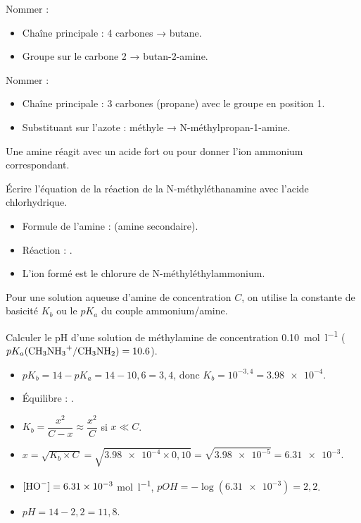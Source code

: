 \begin{exemple}
Nommer  :
\begin{itemize}
    \item Chaîne principale : 4 carbones → butane.
    \item Groupe  sur le carbone 2 → butan-2-amine.
\end{itemize}
Nommer  :
\begin{itemize}
    \item Chaîne principale : 3 carbones (propane) avec le groupe  en position 1.
    \item Substituant sur l'azote : méthyle → N-méthylpropan-1-amine.
\end{itemize}
\end{exemple}

Une amine  réagit avec un acide fort  ou  pour donner l'ion ammonium correspondant.

\begin{exemple}
Écrire l'équation de la réaction de la N-méthyléthanamine avec l'acide chlorhydrique.
\begin{itemize}
    \item Formule de l'amine :  (amine secondaire).
    \item Réaction : .
    \item L'ion formé est le chlorure de N-méthyléthylammonium.
\end{itemize}
\end{exemple}

Pour une solution aqueuse d'amine de concentration $C$, on utilise la constante de basicité $K_b$ ou le $pK_a$ du couple ammonium/amine.

\begin{exemple}
Calculer le pH d'une solution de méthylamine  de concentration \SI{0.10}{\mol\per\litre} ($pK_a(\ce{CH3NH3+/CH3NH2}) = \num{10.6}$).
\begin{itemize}
    \item $pK_b = 14 - pK_a = 14 - 10,6 = 3,4$, donc $K_b = 10^{-3,4} = \num{3,98e-4}$.
    \item Équilibre : .
    \item $K_b = \dfrac{x^2}{C - x} \approx \dfrac{x^2}{C}$ si $x \ll C$.
    \item $x = \sqrt{K_b \times C} = \sqrt{\num{3,98e-4} \times 0,10} = \sqrt{\num{3,98e-5}} = \num{6,31e-3}$.
    \item $[\ce{HO-}] = \num{6,31e-3}$ \si{\mol\per\litre}, $pOH = -\log(\num{6,31e-3}) = 2,2$.
    \item $pH = 14 - 2,2 = 11,8$.
\end{itemize}
\end{exemple}


